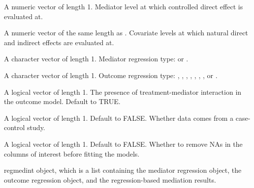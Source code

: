 \documentclass[a4paper]{book}
\begin{document}
\begin{Arguments}
\begin{ldescription}
\item[\code{m\_cde}] A numeric vector of length 1. Mediator level at which controlled direct effect is evaluated at.

\item[\code{c\_cond}] A numeric vector of the same length as . Covariate levels at which natural direct and indirect effects are evaluated at.

\item[\code{mreg}] A character vector of length 1. Mediator regression type:  or .

\item[\code{yreg}] A character vector of length 1. Outcome regression type: , , , , , , , or .

\item[\code{interaction}] A logical vector of length 1. The presence of treatment-mediator interaction in the outcome model. Default to TRUE.

\item[\code{casecontrol}] A logical vector of length 1. Default to FALSE. Whether data comes from a case-control study.

\item[\code{na\_omit}] A logical vector of length 1. Default to FALSE. Whether to remove NAs in the columns of interest before fitting the models.
\end{ldescription}
\end{Arguments}
%
\begin{Value}
regmedint object, which is a list containing the mediator regression object, the outcome regression object, and the regression-based mediation results.
\end{Value}
%
\end{document}
